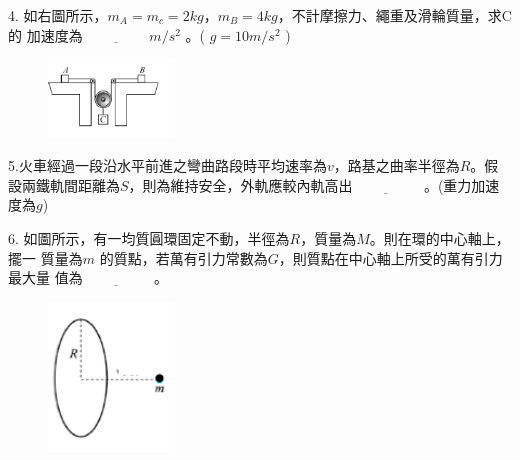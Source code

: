\documentclass[cn,10pt,math=newtx]{elegantbook}
\begin{document}
\begin{example}
  4. 如右圖所示，$m_A = m_c = 2 kg$，$m_B = 4 kg$，不計摩擦力、繩重及滑輪質量，求C 的
加速度為$\underline{\hspace{2cm}} m/s^2$ 。( $g= 10 m/s^2$ ) \\
    \rightline{[中壢高中教甄109]}
\end{example}
\begin{solution}
    
\end{solution}
\begin{figure}[htbp]
    \flushright
    \includegraphics[width=0.3\textwidth]{image/109中壢4.png}
  \end{figure}
\newpage


\begin{example}
   5.火車經過一段沿水平前進之彎曲路段時平均速率為$v$，路基之曲率半徑為$R$。假設兩鐵軌間距離為$S$，則為維持安全，外軌應較內軌高出$\underline{\hspace{2cm}}$ 。(重力加速度為$g$)\\
    \rightline{[中壢高中教甄109]}
\end{example}
\begin{solution}
    
\end{solution}

\newpage

\begin{example}
   6. 如圖所示，有一均質圓環固定不動，半徑為$R$，質量為$M$。則在環的中心軸上，擺一
質量為$m$ 的質點，若萬有引力常數為$G$，則質點在中心軸上所受的萬有引力最大量
值為$\underline{\hspace{2cm}}$ 。\\
    \rightline{[中壢高中教甄109]}
\end{example}
\begin{solution}
    
\end{solution}
\begin{figure}[htbp]
    \flushright
    \includegraphics[width=0.3\textwidth]{image/109中壢6.png}
  \end{figure}
\newpage
\end{document}
